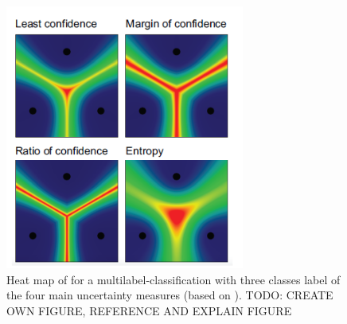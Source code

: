\begin{figure}[t]
  \centering
    \includegraphics[width=0.70\textwidth]{figures/uncertainty_sampling_heatmap.PNG}
  \caption{ Heat map of for a multilabel-classification with three classes label of the four main uncertainty measures (based on \cite{human-in-the-loop}).
  TODO: CREATE OWN FIGURE, REFERENCE AND EXPLAIN FIGURE}
  \label{fig:uncertainty_sampling_heatmap}
\end{figure}